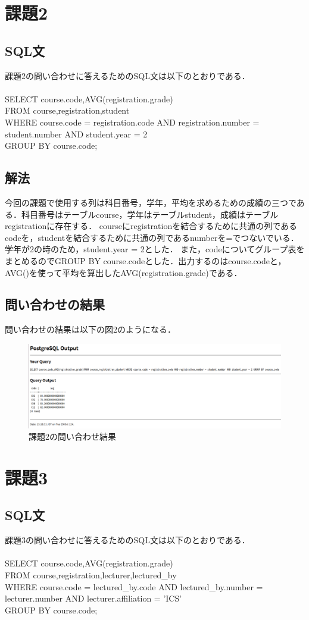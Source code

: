 \documentclass[dvipdfmx]{jarticle}
\begin{document}
\section{課題2}
\subsection{SQL文}
課題2の問い合わせに答えるためのSQL文は以下のとおりである．
\\\\
SELECT course.code,AVG(registration.grade)\\
FROM course,registration,student\\
WHERE course.code = registration.code AND registration.number = student.number AND student.year = 2\\
GROUP BY course.code;
\subsection{解法}
今回の課題で使用する列は科目番号，学年，平均を求めるための成績の三つである．科目番号はテーブルcourse，学年はテーブルstudent，成績はテーブルregistrationに存在する．
courseにregistrationを結合するために共通の列であるcodeを，studentを結合するために共通の列であるnumberを=でつないでいる．学年が2の時のため，student.year = 2とした．
また，codeについてグループ表をまとめるのでGROUP BY course.codeとした．出力するのはcourse.codeと，AVG()を使って平均を算出したAVG(registration.grade)である．
\subsection{問い合わせの結果}
問い合わせの結果は以下の図2のようになる．
\begin{figure}[h]
    \centering
    \includegraphics[width=12cm]{kadai2.png}
    \caption{課題2の問い合わせ結果}
\end{figure}
\section{課題3}
\subsection{SQL文}
課題3の問い合わせに答えるためのSQL文は以下のとおりである．
\\\\
SELECT course.code,AVG(registration.grade)\\
FROM course,registration,lecturer,lectured\_by\\
WHERE course.code = lectured\_by.code AND lectured\_by.number = lecturer.number AND lecturer.affiliation = 'ICS'\\
GROUP BY course.code; 
\end{document}
